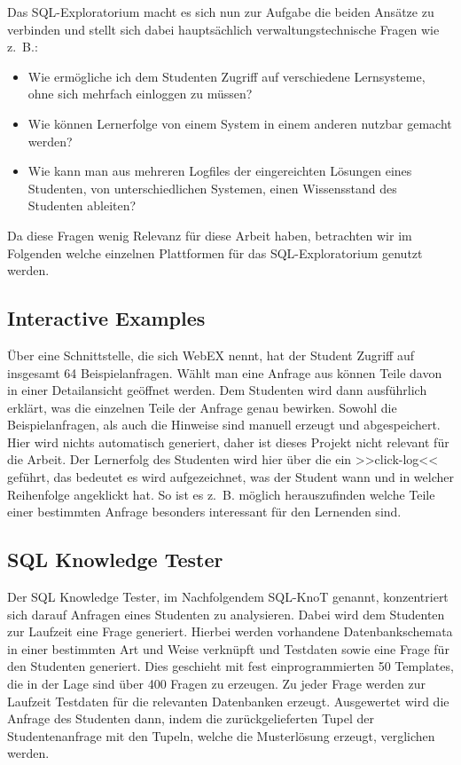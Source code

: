 Das SQL-Exploratorium macht es sich nun zur Aufgabe die beiden Ansätze zu verbinden und stellt sich dabei hauptsächlich verwaltungstechnische Fragen wie \mbox{z. B.}: 

\begin{itemize}
\item Wie ermögliche ich dem Studenten Zugriff auf verschiedene Lernsysteme, ohne sich mehrfach einloggen zu müssen?
\item Wie können Lernerfolge von einem System in einem anderen nutzbar gemacht werden?
\item Wie kann man aus mehreren Logfiles der eingereichten Lösungen eines Studenten, von unterschiedlichen Systemen, einen Wissensstand des Studenten ableiten?
\end{itemize}

Da diese Fragen wenig Relevanz für diese Arbeit haben, betrachten wir im Folgenden welche einzelnen Plattformen für das SQL-Exploratorium genutzt werden.

\subsection{Interactive Examples}

Über eine Schnittstelle, die sich WebEX nennt, hat der Student Zugriff auf insgesamt 64 Beispielanfragen. Wählt man eine Anfrage aus können Teile davon in einer Detailansicht geöffnet werden. Dem Studenten wird dann ausführlich erklärt, was die einzelnen Teile der Anfrage genau bewirken. Sowohl die Beispielanfragen, als auch die Hinweise sind manuell erzeugt und abgespeichert. Hier wird nichts automatisch generiert, daher ist dieses Projekt nicht relevant für die Arbeit. Der Lernerfolg des Studenten wird hier über die ein >>click-log<< geführt, das bedeutet es wird aufgezeichnet, was der Student wann und in welcher Reihenfolge angeklickt hat. So ist es \mbox{z. B.} möglich herauszufinden welche Teile einer bestimmten Anfrage besonders interessant für den Lernenden sind.

\subsection{SQL Knowledge Tester}

Der SQL Knowledge Tester, im Nachfolgendem SQL-KnoT genannt, konzentriert sich darauf Anfragen eines Studenten zu analysieren. Dabei wird dem Studenten zur Laufzeit eine Frage generiert. Hierbei werden vorhandene Datenbankschemata in einer bestimmten Art und Weise verknüpft und Testdaten sowie eine Frage für den Studenten generiert. Dies geschieht mit fest einprogrammierten 50 Templates, die in der Lage sind über 400 Fragen zu erzeugen. Zu jeder Frage werden zur Laufzeit Testdaten für die relevanten Datenbanken erzeugt. Ausgewertet wird die Anfrage des Studenten dann, indem die zurückgelieferten Tupel der Studentenanfrage mit den Tupeln, welche die Musterlösung erzeugt, verglichen werden.

